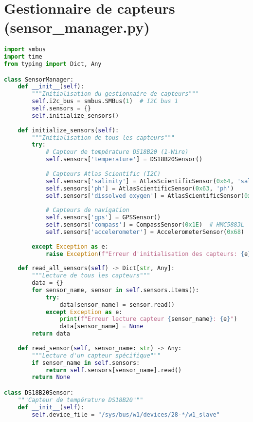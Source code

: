 \section{Gestionnaire de capteurs (sensor\_manager.py)}
\begin{lstlisting}[language=Python, caption=Gestionnaire des capteurs, label=lst:sensor-manager]
import smbus
import time
from typing import Dict, Any

class SensorManager:
    def __init__(self):
        """Initialisation du gestionnaire de capteurs"""
        self.i2c_bus = smbus.SMBus(1)  # I2C bus 1
        self.sensors = {}
        self.initialize_sensors()
    
    def initialize_sensors(self):
        """Initialisation de tous les capteurs"""
        try:
            # Capteur de température DS18B20 (1-Wire)
            self.sensors['temperature'] = DS18B20Sensor()
            
            # Capteurs Atlas Scientific (I2C)
            self.sensors['salinity'] = AtlasScientificSensor(0x64, 'salinity')
            self.sensors['ph'] = AtlasScientificSensor(0x63, 'ph')
            self.sensors['dissolved_oxygen'] = AtlasScientificSensor(0x61, 'do')
            
            # Capteurs de navigation
            self.sensors['gps'] = GPSSensor()
            self.sensors['compass'] = CompassSensor(0x1E)  # HMC5883L
            self.sensors['accelerometer'] = AccelerometerSensor(0x68)  # MPU6050
            
        except Exception as e:
            raise Exception(f"Erreur d'initialisation des capteurs: {e}")
    
    def read_all_sensors(self) -> Dict[str, Any]:
        """Lecture de tous les capteurs"""
        data = {}
        for sensor_name, sensor in self.sensors.items():
            try:
                data[sensor_name] = sensor.read()
            except Exception as e:
                print(f"Erreur lecture capteur {sensor_name}: {e}")
                data[sensor_name] = None
        return data
    
    def read_sensor(self, sensor_name: str) -> Any:
        """Lecture d'un capteur spécifique"""
        if sensor_name in self.sensors:
            return self.sensors[sensor_name].read()
        return None

class DS18B20Sensor:
    """Capteur de température DS18B20"""
    def __init__(self):
        self.device_file = "/sys/bus/w1/devices/28-*/w1_slave"
    

\end{lstlisting}
